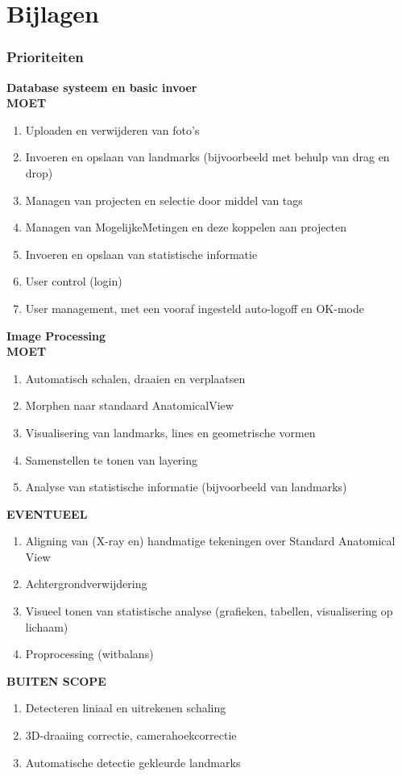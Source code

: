 \chapter{Bijlagen}
\label{Bijlagen}

\subsection{Prioriteiten}
\Large{\textbf{Database systeem en basic invoer}}\\
\large{\textbf{MOET}}
\begin{enumerate}
	\item Uploaden en verwijderen van foto's
	\item Invoeren en opslaan van landmarks (bijvoorbeeld met behulp van drag en drop)
	\item Managen van projecten en selectie door middel van tags
	\item Managen van MogelijkeMetingen en deze koppelen aan projecten
	\item Invoeren en opslaan van statistische informatie
	\item User control (login)
	\item User management, met een vooraf ingesteld auto-logoff en OK-mode
\end{enumerate}
\Large{\textbf{Image Processing}}\\
\large{\textbf{MOET}}
\begin{enumerate}
	\item Automatisch schalen, draaien en verplaatsen
	\item Morphen naar standaard AnatomicalView
	\item Visualisering van landmarks, lines en geometrische vormen
	\item Samenstellen te tonen van layering
	\item Analyse van statistische informatie (bijvoorbeeld van landmarks)
\end{enumerate}
\large{\textbf{EVENTUEEL}}
\begin{enumerate}
	\item Aligning van (X-ray en) handmatige tekeningen over Standard Anatomical View
	\item Achtergrondverwijdering
	\item Visueel tonen van statistische analyse (grafieken, tabellen, visualisering op lichaam)
	\item Proprocessing (witbalans)
\end{enumerate}
\large{\textbf{BUITEN SCOPE}}
\begin{enumerate}
	\item Detecteren liniaal en uitrekenen schaling
	\item 3D-draaiing correctie, camerahoekcorrectie
	\item Automatische detectie gekleurde landmarks
\end{enumerate}

